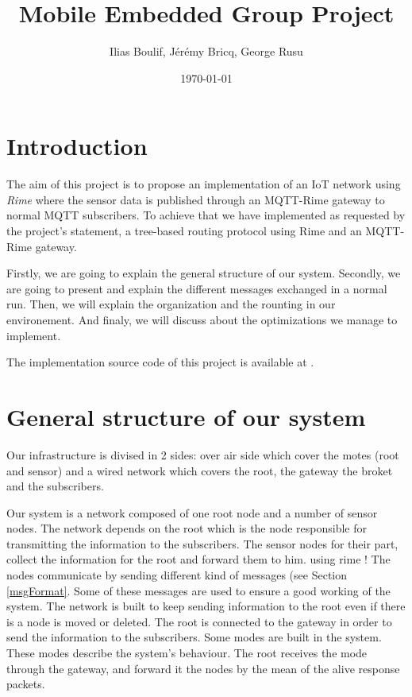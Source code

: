 \documentclass[a4paper,10pt]{article}
\title{Mobile Embedded Group Project}
\author{Ilias Boulif, Jérémy Bricq, George Rusu}
\date{\today}
\begin{document}
\maketitle
\tableofcontents
\newpage
\section{Introduction}

The aim of this project is to propose an implementation of an IoT network using \textit{Rime} where the sensor data is published through an MQTT-Rime gateway to normal MQTT subscribers. To achieve that we have implemented as requested by the project's statement, a tree-based routing protocol using Rime and an MQTT-Rime gateway.

Firstly, we are going to explain the general structure of our system. Secondly, we are going to present and explain the different messages exchanged in a normal run. Then, we will explain the organization and the rounting in our environement. And finaly, we will discuss about the optimizations we manage to implement.

The implementation source code of this project is available at \cite{github}.


\section{General structure of our system}
Our infrastructure is divised in 2 sides: over air side which cover the motes (root and sensor) and a wired network which covers the root, the gateway the broket and the subscribers. 


Our system is a network composed of one root node and a number of sensor nodes. The network depends on the root which is the node responsible for transmitting the information to the subscribers. The sensor nodes for their part, collect the information for the root and forward them to him.  using rime ! The nodes communicate by sending different kind of messages (see Section \ref{msgFormat}. Some of these messages are used to ensure a good working of the system. The network is built to keep sending information to the root even if there is a node is moved or deleted.  The root is connected to the gateway in order to send the information to the subscribers. Some modes are built in the system. These modes describe the system's behaviour. The root receives the mode through the gateway, and forward it the nodes by the mean of the alive response packets. 
\end{document}
